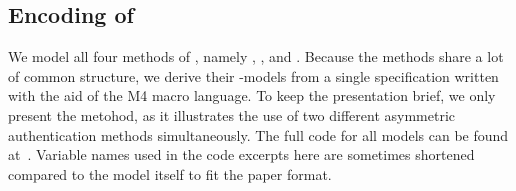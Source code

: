 \subsection{\mTamarin{} Encoding of \mEdhoc{}}
\label{sec:modeling}
%
We model all four methods of \mEdhoc{}, namely
\mSigSig, \mSigStat, \mStatSig{} and \mStatStat.
%
Because the methods share a lot of common structure, we derive
their \mTamarin-models from a single specification written with the aid of the
M4 macro language.
%
%
To keep the presentation brief, we only present the \mStatSig{} metohod, as it
illustrates the use of two different asymmetric authentication methods
simultaneously.
%
The full \mTamarin{} code for all models can be found at~\cite{edhocTamarinRepo}.
%
Variable names used in the code excerpts here are sometimes shortened compared
to the model itself to fit the paper format.
%

%


